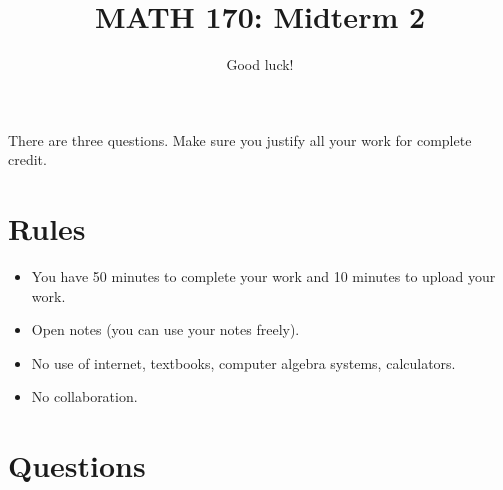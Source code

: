 \documentclass[12pt]{amsart}
\title{ MATH 170: Midterm 2 }
\author{Good luck!}
\date{}
\begin{document}
\maketitle

There are three questions. Make sure you justify all your work for complete credit.

\section*{Rules}

\begin{itemize}[leftmargin=*]
    \item You have 50 minutes to complete your work and 10 minutes to upload your work.
    \item Open notes (you can use your notes freely).
    \item No use of internet, textbooks, computer algebra systems, calculators. 
    \item No collaboration.
\end{itemize}

\section*{Questions}
\end{document}
